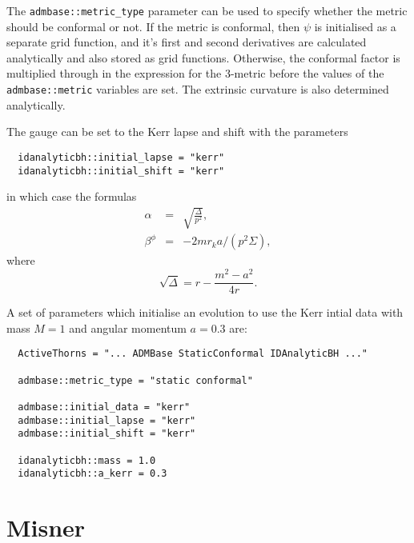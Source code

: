 \documentclass{article}
\begin{document}
The \texttt{admbase::metric\_type} parameter can be used to specify
whether the metric should be conformal or not. If the metric is
conformal, then $\psi$ is initialised as a separate grid function, and
it's first and second derivatives are calculated analytically and also
stored as grid functions. Otherwise, the conformal factor is
multiplied through in the expression for the 3-metric before the
values of the \texttt{admbase::metric} variables are set. The
extrinsic curvature is also determined analytically.

The gauge can be set to the Kerr lapse and shift with the parameters
\begin{verbatim}
  idanalyticbh::initial_lapse = "kerr"
  idanalyticbh::initial_shift = "kerr"
\end{verbatim}
in which case the formulas
\begin{eqnarray}
  \alpha & = &\sqrt{\frac{\Delta}{p^2}}, \\
  \beta^\phi & = & -2 m r_k a / (p^2 \Sigma),
\end{eqnarray}
where
\begin{equation}
  \sqrt{\Delta} = r - \frac{m^2 - a^2}{4r}.
\end{equation}

A set of parameters which initialise an evolution to use the Kerr
intial data with mass $M=1$ and angular momentum $a=0.3$ are:
\begin{verbatim}
  ActiveThorns = "... ADMBase StaticConformal IDAnalyticBH ..."

  admbase::metric_type = "static conformal"

  admbase::initial_data = "kerr"
  admbase::initial_lapse = "kerr"
  admbase::initial_shift = "kerr"

  idanalyticbh::mass = 1.0
  idanalyticbh::a_kerr = 0.3
\end{verbatim}

\section{Misner}
\end{document}
